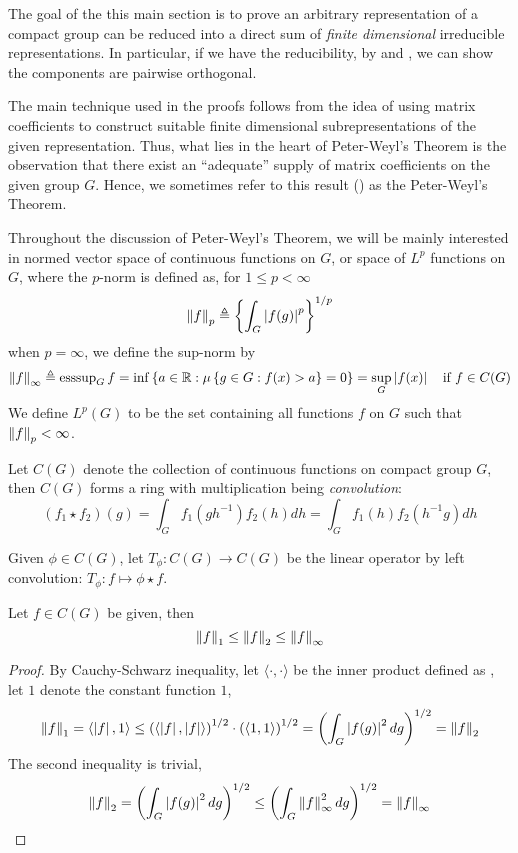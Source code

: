 The goal of the this main section is to prove an arbitrary representation of a
compact group can be reduced into a direct sum of \emph{finite dimensional}
irreducible representations.  In particular, if we have the reducibility, by
 and , we can show the components are
pairwise orthogonal.

The main technique used in the proofs follows from the idea of using matrix
coefficients to construct suitable finite dimensional subrepresentations of the
given representation.  Thus, what lies in the heart of Peter-Weyl's Theorem is
the observation that there exist an ``adequate'' supply of matrix coefficients
on the given group $G$.  Hence, we sometimes refer to this result
() as the Peter-Weyl's Theorem.


Throughout the discussion of Peter-Weyl's Theorem, we will be mainly interested
in normed vector space of continuous functions on $G$, or space of $L^p$
functions on $G$, where the $p$-norm is defined as, for $1 \leq p < \infty$
\[
  \left\lVert f\right\rVert_p \triangleq \left\{ \int_G \left|f(g)\right|^{p}   \right\}^{1/p}
\]
when $p = \infty$, we define the sup-norm by
\[
  \left\lVert f\right\rVert_{\infty} \triangleq \operatorname{esssup}_G f = \inf \left\{ a \in \operatorname{\mathbb{R}} : \mu\left\{ g \in G : f(x) > a \right\} = 0 \right\}
  = \sup_{G} \left|f(x)\right| \quad \text{if } f \in C(G)
\]
We define $L^p(G)$ to be the set containing all functions $f$ on $G$ such that
$\left\lVert f\right\rVert_p < \infty$.

Let $C(G)$ denote the collection of continuous functions on compact group $G$,
then $C(G)$ forms a ring with multiplication being \emph{convolution}:
\[
  (f_1 \star f_2)(g) = \int_G f_1(gh^{-1}) f_2(h) dh = \int_G f_1(h) f_2(h^{-1}g) dh
\]

Given $\phi \in C(G)$, let $T_{\phi} : C(G) \to C(G)$ be the linear operator by
left convolution: $T_{\phi} : f \mapsto \phi \star f$.

\begin{prop} \label{1-2-infty}
  Let $f \in C(G)$ be given, then
  \[
    \left\lVert f\right\rVert_1 \leq \left\lVert f\right\rVert_2 \leq \left\lVert f\right\rVert_{\infty}
  \]
\end{prop}

\begin{proof}
  By Cauchy-Schwarz inequality, let $\langle \cdot , \cdot \rangle$ be the inner
  product defined as , let $1$ denote the constant
  function $1$,
  \[
    \left\lVert f\right\rVert_1 = \langle \left|f\right| , 1 \rangle
    \leq \left(\langle \left|f\right|, \left|f\right| \rangle \right)^{1/2} \cdot \left( \langle 1, 1 \rangle \right)^{1/2}
    = \left( \int_G \left|f(g)\right|^2 dg \right)^{1/2} = \left\lVert f\right\rVert_2
  \]
  The second inequality is trivial,
  \[
    \left\lVert f\right\rVert_2
    = \left( \int_G \left|f(g)\right|^2 dg \right)^{1/2}
    \leq \left( \int_G \left\lVert f\right\rVert_{\infty}^{2} dg \right)^{1/2}
    = \left\lVert f\right\rVert_{\infty}
  \]
\end{proof}

